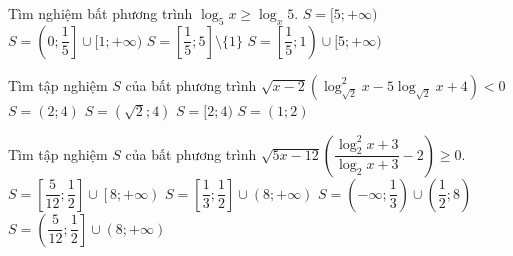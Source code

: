 \begin{ex}%
	Tìm nghiệm bất phương trình $\log_5x\geq\log_x5$. 
	\choice
	{$S=[5;+\infty)$}
	{$S=\left(0;\dfrac{1}{5}\right]\cup[1;+\infty)$}
	{$S=\left[\dfrac{1}{5};5\right]\setminus\{1\}$}
	{\True $S=\left[\dfrac{1}{5};1\right)\cup[5;+\infty)$}
\end{ex}
\begin{ex}%
	Tìm tập nghiệm $S$ của bất phương trình $\sqrt{x-2}\left(\log_{\sqrt{2}}^2x-5\log_{\sqrt{2}}x+4\right)<0$ 
	\choice
	{\True $S=(2;4)$}
	{$S=(\sqrt{2};4)$}
	{$S=[2;4)$}
	{$S=(1;2)$}
\end{ex}
\begin{ex}%
	Tìm tập nghiệm $S$ của bất phương trình $\sqrt{5x-12}\left(\dfrac{\log_2^2x+3}{\log_2x+3}-2\right)\geq 0$. 
	\choice
	{\True $S=\left[\dfrac{5}{12};\dfrac{1}{2}\right]\cup\left[ 8; + \infty \right)$}
	{$S=\left[\dfrac{1}{3};\dfrac{1}{2}\right]\cup(8;+\infty)$}
	{$S=\left(-\infty;\dfrac{1}{3}\right)\cup\left(\dfrac{1}{2};8\right)$}
	{$S=\left(\dfrac{5}{12};\dfrac{1}{2}\right]\cup(8;+\infty)$}
\end{ex}
